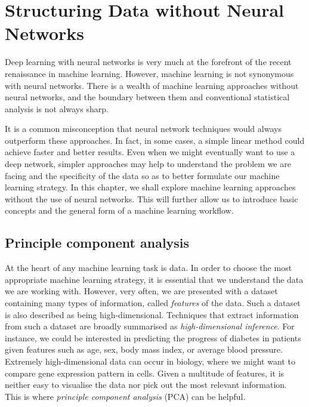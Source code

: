 \section{Structuring Data without Neural Networks}
\label{sec:structuring_data}
Deep learning with neural networks is very much at the forefront of the recent renaissance in machine learning. However,
machine learning is not synonymous with neural networks.
There is a wealth of machine learning approaches without neural networks, and the boundary between them and conventional statistical analysis is not always sharp.

It is a common misconception that neural network techniques would always outperform these approaches. In fact, in some cases, a simple linear method could achieve faster and better results. Even when we might eventually want to use a deep network, simpler approaches may help to understand the problem we are facing and the specificity of the data so as to better formulate our machine learning strategy. In this chapter, we shall explore machine learning approaches without the use of neural networks. This will further allow us to introduce basic concepts and the general form of a machine learning workflow.

\subsection{Principle component analysis}

At the heart of any machine learning task is data. In order to choose the most appropriate machine learning strategy, it is essential that we understand the data we are working with. However, very often, we are presented with a dataset containing many types of information, called \emph{features} of the data. Such a dataset is also described as being high-dimensional. Techniques that extract information from such a dataset are broadly summarised as \emph{high-dimensional inference}.
For instance, we could be interested in predicting the progress of diabetes in patients given features such as age, sex, body mass index, or average blood pressure. Extremely high-dimensional data can occur in biology, where we might want to compare gene expression pattern in cells.
Given a multitude of features, it is neither easy to visualise the data nor pick out the most relevant information. This is where \textit{principle component analysis} (PCA) can be helpful.

